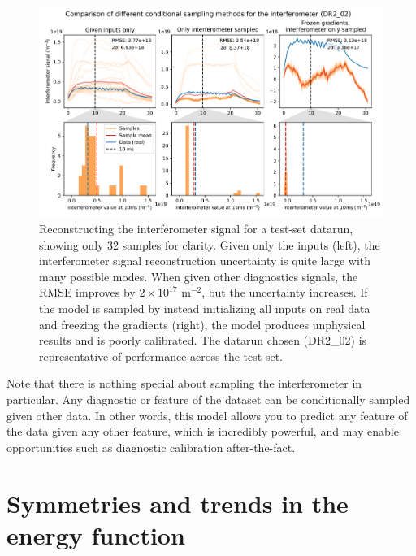 \begin{figure}
	\centering
	\includegraphics[width=\linewidth]{figures/interferometer_sampling_comp_39-0.pdf}
	\caption{\label{fig:ifo_sample}Reconstructing the interferometer signal for a test-set datarun, showing only 32 samples for clarity. Given only the inputs (left), the interferometer signal reconstruction uncertainty is quite large with many possible modes. When given other diagnostics signals, the RMSE improves by $2 \times 10^{17}$ m$^{-2}$, but the uncertainty increases. If the model is sampled by instead initializing all inputs on real data and freezing the gradients (right), the model produces unphysical results and is poorly calibrated. The datarun chosen (DR2\_02) is representative of performance across the test set. }
\end{figure}

Note that there is nothing special about sampling the interferometer in particular. Any diagnostic or feature of the dataset can be conditionally sampled given other data. In other words, this model allows you to predict any feature of the data given any other feature, which is incredibly powerful, and may enable opportunities such as diagnostic calibration after-the-fact.

\section{Symmetries and trends in the energy function}

